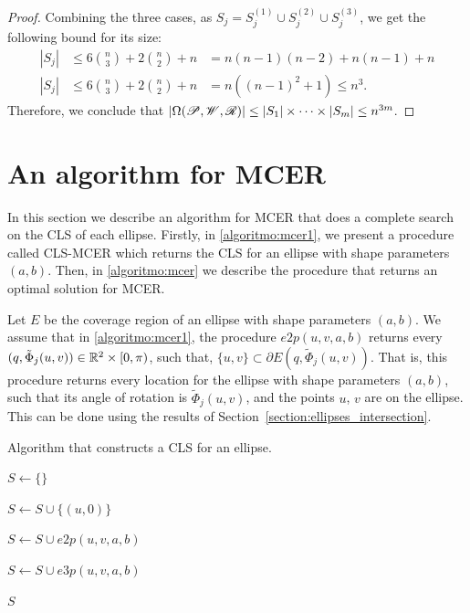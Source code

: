 \begin{proof}
	Combining the three cases, as $S_j=S_j^{(1)}\cup S_j^{(2)} \cup S_j^{(3)}$, we get the following bound for its size:
	\begin{eqnarray*}
	|S_j| &\le 6\binom{n}{3} + 2\binom{n}{2} + n &= n(n-1)(n-2) + n(n-1) + n\\
	|S_j| &\le 6\binom{n}{3} + 2\binom{n}{2} + n &= n((n-1)^2+1) \le n^3.
	\end{eqnarray*}	
	Therefore, we conclude that  $|\Omega(\mathscr{P}, \mathscr{W}, \mathscr{R})| \le |S_1|\times \dots \times |S_m| \le n^{3m}$.
\end{proof}


\section{An algorithm for MCER}

In this section we describe an algorithm for MCER that does a complete search on the CLS of each ellipse.
Firstly, in \autoref{algoritmo:mcer1}, we present a procedure called CLS-MCER which returns the CLS for an ellipse with shape parameters $(a, b)$. Then, in \autoref{algoritmo:mcer} we describe the procedure that returns an optimal solution for MCER.

Let $E$ be the coverage region of an ellipse with shape parameters $(a, b)$. We assume that in \autoref{algoritmo:mcer1}, the procedure $e2p(u, v, a, b)$ returns every $(q, \tilde{\Phi}_j(u,v)) \in \mathbb{R}^2\times[0, \pi)$, such that, $\{u, v\}\subset \partial E(q, \tilde{\Phi}_j(u,v))$. That is, this procedure returns every location for the ellipse with shape parameters $(a, b)$, such that its angle of rotation is $\tilde{\Phi}_j(u,v)$, and the points $u$, $v$ are on the ellipse. This can be done using the results of Section~\ref{section:ellipses_intersection}.

\begin{algoritmo}
	\caption{Algorithm that constructs a CLS for an ellipse.}\label{algoritmo:mcer1}
	\begin{algorithmic}[1]
		
		
		\item[]
		
		\State $S \gets \{\}$
		
		\State $S \gets S \cup \{(u, 0)\}$
		\EndFor
		
		\State $S \gets S \cup e2p(u, v, a, b)$
		\EndFor
		
		\State $S \gets S \cup e3p(u, v, a, b)$ 
		\EndFor
		
		\State \Return $S$
		\EndProcedure
	\end{algorithmic}
\end{algoritmo}


